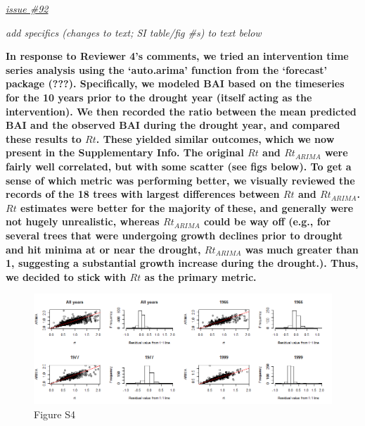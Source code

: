 \documentclass[
]{article}
\begin{document}
\href{https://github.com/SCBI-ForestGEO/McGregor_climate-sensitivity-variation/issues/92}{\emph{issue
\#92}}

\emph{add specifics (changes to text; SI table/fig \#s) to text below}

\textbf{In response to Reviewer 4's comments, we tried an intervention
time series analysis using the `auto.arima' function from the `forecast'
package ({\textbf{???}}). Specifically, we modeled BAI based on the
timeseries for the 10 years prior to the drought year (itself acting as
the intervention). We then recorded the ratio between the mean predicted
BAI and the observed BAI during the drought year, and compared these
results to \(Rt\). These yielded similar outcomes, which we now present
in the Supplementary Info. The original \(Rt\) and \(Rt_{ARIMA}\) were
fairly well correlated, but with some scatter (see figs below). To get a
sense of which metric was performing better, we visually reviewed the
records of the 18 trees with largest differences between \(Rt\) and
\(Rt_{ARIMA}\). \(Rt\) estimates were better for the majority of these,
and generally were not hugely unrealistic, whereas \(Rt_{ARIMA}\) could
be way off (e.g., for several trees that were undergoing growth declines
prior to drought and hit minima at or near the drought, \(Rt_{ARIMA}\)
was much greater than 1, suggesting a substantial growth increase during
the drought.). Thus, we decided to stick with \(Rt\) as the primary
metric.}

\begin{figure}
\centering
\includegraphics{tables_figures/publication/figureS4_Rt_arima_comparison.png}
\caption{Figure S4}
\end{figure}
\end{document}

